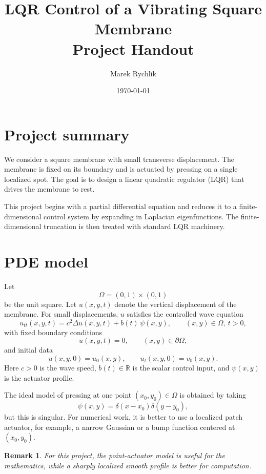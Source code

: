 \documentclass[11pt]{article}
\title{LQR Control of a Vibrating Square Membrane\\\large Project Handout}
\author{Marek Rychlik}
\date{\today}
\newcommand{\R}{\mathbb{R}}
\newtheorem*{remark}{Remark}
\begin{document}
\maketitle

\section*{Project summary}
We consider a square membrane with small transverse displacement. The 
membrane is fixed on its boundary and is actuated by pressing on a 
single localized spot. The goal is to design a linear quadratic regulator 
(LQR) that drives the membrane to rest.

This project begins with a partial differential equation and reduces it 
to a finite-dimensional control system by expanding in Laplacian 
eigenfunctions. The finite-dimensional truncation is then treated with 
standard LQR machinery.

\section{PDE model}
Let
\[
\Omega = (0,1)\times(0,1)
\]
be the unit square. Let $u(x,y,t)$ denote the vertical displacement of 
the membrane. For small displacements, $u$ satisfies the controlled 
wave equation
\begin{equation}
\label{eq:wave}
 u_{tt}(x,y,t) = c^2 \Delta u(x,y,t) + b(t)\,\psi(x,y), 
 \qquad (x,y)\in\Omega,\ t>0,
\end{equation}
with fixed boundary conditions
\begin{equation}
\label{eq:bc}
 u(x,y,t)=0,\qquad (x,y)\in \partial\Omega,
\end{equation}
and initial data
\begin{equation}
\label{eq:ic}
 u(x,y,0)=u_0(x,y),\qquad u_t(x,y,0)=v_0(x,y).
\end{equation}
Here $c>0$ is the wave speed, $b(t)\in\R$ is the scalar control input, 
and $\psi(x,y)$ is the actuator profile.

The ideal model of pressing at one point $(x_0,y_0)\in\Omega$ is 
obtained by taking
\[
\psi(x,y)=\delta(x-x_0)\delta(y-y_0),
\]
but this is singular. For numerical work, it is better to use a 
localized patch actuator, for example, a narrow Gaussian or a bump 
function centered at $(x_0,y_0)$.

\begin{remark}
For this project, the point-actuator model is useful for the 
mathematics, while a sharply localized smooth profile is better for 
computation.
\end{remark}
\end{document}
